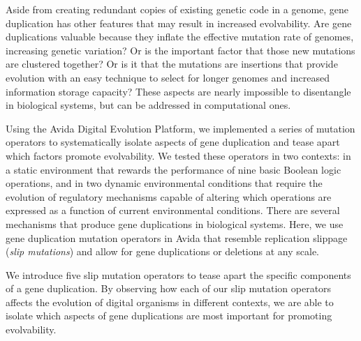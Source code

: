 Aside from creating redundant copies of existing genetic code in a genome, gene duplication has other features that may result in increased evolvability. Are gene duplications valuable because they inflate the effective mutation rate of genomes, increasing genetic variation?  Or is the important factor that those new mutations are clustered together?
Or is it that the mutations are insertions that provide evolution with an easy technique to select for longer genomes %
and increased information storage capacity? %
These aspects are nearly impossible to disentangle in biological systems, but can be addressed in computational ones.

Using the Avida Digital Evolution Platform, we implemented a series of mutation operators to systematically isolate aspects of gene duplication and tease apart which factors promote evolvability. We tested these operators in two %
contexts: in a static environment that rewards the performance of nine basic Boolean logic operations, and in two dynamic environmental conditions that require the evolution of regulatory mechanisms capable of altering which operations are expressed as a function of current environmental conditions. %
There are several mechanisms that produce gene duplications in biological systems. Here, we use gene duplication mutation operators in Avida that resemble replication slippage \citep{bzymek_instability_2001} (\textit{slip mutations}) and allow for gene duplications or deletions at any scale.

We introduce five slip mutation operators to tease apart the specific components of a gene duplication.
By observing how each of our slip mutation operators affects the evolution of digital organisms in different contexts, we are able to isolate which aspects of gene duplications are most important for promoting evolvability.


